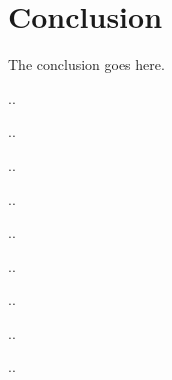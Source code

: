 \section{Conclusion}
\label{Conclusion}
The conclusion goes here.

..

..

..

..

..

..

..

..

..